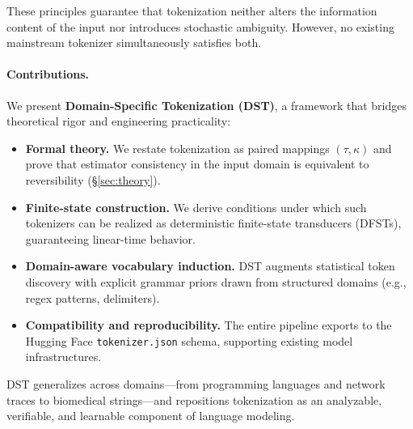These principles guarantee that tokenization neither alters the information content of the input nor introduces stochastic ambiguity.  
However, no existing mainstream tokenizer simultaneously satisfies both.

\paragraph{Contributions.}
We present \textbf{Domain-Specific Tokenization (DST)}, a framework that bridges theoretical rigor and engineering practicality:
\begin{itemize}
    \item \textbf{Formal theory.} We restate tokenization as paired mappings $(\tau,\kappa)$ and prove that estimator consistency in the input domain is equivalent to reversibility (\S\ref{sec:theory}).  
    \item \textbf{Finite-state construction.} We derive conditions under which such tokenizers can be realized as deterministic finite-state transducers (DFSTs), guaranteeing linear-time behavior.  
    \item \textbf{Domain-aware vocabulary induction.} DST augments statistical token discovery with explicit grammar priors drawn from structured domains (e.g., regex patterns, delimiters).  
    \item \textbf{Compatibility and reproducibility.} The entire pipeline exports to the Hugging Face \texttt{tokenizer.json} schema, supporting existing model infrastructures.  
\end{itemize}

DST generalizes across domains---from programming languages and network traces to biomedical strings---and repositions tokenization as an analyzable, verifiable, and learnable component of language modeling.

